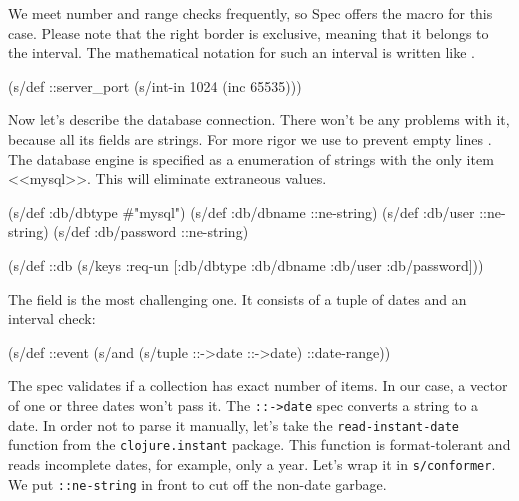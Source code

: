 
We meet number and range checks frequently, so Spec offers the  macro for this case. Please note that the right border is exclusive, meaning that it belongs to the interval. The mathematical notation for such an interval is written like \code{[1024, 65535)}.

\begin{clojure}
(s/def ::server_port
  (s/int-in 1024 (inc 65535)))
\end{clojure}


Now let's describe the database connection. There won't be any problems with it, because all its fields are strings. For more rigor we use  to prevent empty lines . The database engine is specified as a enumeration of strings with the only item <<mysql>>. This will eliminate extraneous values.

\begin{clojure}
(s/def :db/dbtype   #{"mysql"})
(s/def :db/dbname   ::ne-string)
(s/def :db/user     ::ne-string)
(s/def :db/password ::ne-string)

(s/def ::db
  (s/keys :req-un [:db/dbtype
                   :db/dbname
                   :db/user
                   :db/password]))
\end{clojure}

The  field is the most challenging one. It consists of a tuple of dates and an interval check:

\begin{clojure}
(s/def ::event
  (s/and (s/tuple ::->date ::->date)
         ::date-range))
\end{clojure}


The  spec validates if a collection has exact number of items. In our case, a vector of one or three dates won't pass it. The \verb|::->date| spec converts a string to a date. In order not to parse it manually, let's take the \verb|read-instant-date| function from the \verb|clojure.instant| package. This function is format-tolerant and reads incomplete dates, for example, only a year. Let's wrap it in \verb|s/conformer|. We put \verb|::ne-string| in front to cut off the non-date garbage.


